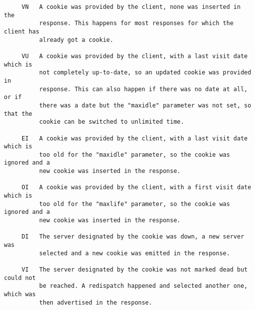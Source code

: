 \begin{verbatim}
     VN   A cookie was provided by the client, none was inserted in the
          response. This happens for most responses for which the client has
          already got a cookie.

     VU   A cookie was provided by the client, with a last visit date which is
          not completely up-to-date, so an updated cookie was provided in
          response. This can also happen if there was no date at all, or if
          there was a date but the "maxidle" parameter was not set, so that the
          cookie can be switched to unlimited time.

     EI   A cookie was provided by the client, with a last visit date which is
          too old for the "maxidle" parameter, so the cookie was ignored and a
          new cookie was inserted in the response.

     OI   A cookie was provided by the client, with a first visit date which is
          too old for the "maxlife" parameter, so the cookie was ignored and a
          new cookie was inserted in the response.

     DI   The server designated by the cookie was down, a new server was
          selected and a new cookie was emitted in the response.

     VI   The server designated by the cookie was not marked dead but could not
          be reached. A redispatch happened and selected another one, which was
          then advertised in the response.


\end{verbatim}
